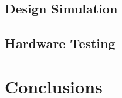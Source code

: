 \documentclass[12pt, letterpaper]{article}
\begin{document}
\subsection{Design Simulation}

\subsection{Hardware Testing}




\newpage
\section{Conclusions}



\appendix
\end{document}
